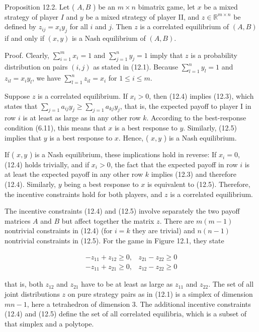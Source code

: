 \documentclass[12pt]{article}
\begin{document}
Proposition 12.2. Let ( $A, B$ ) be an $m \times n$ bimatrix game, let $x$ be a mixed strategy of player $I$ and $y$ be a mixed strategy of player II, and $z \in \mathbb{R}^{m \times n}$ be defined by $z_{i j}=x_{i} y_{j}$ for all $i$ and $j$. Then $z$ is a correlated equilibrium of $(A, B)$ if and only if $(x, y)$ is a Nash equilibrium of $(A, B)$.

Proof. Clearly, $\sum_{i=1}^{m} x_{i}=1$ and $\sum_{j=1}^{n} y_{j}=1$ imply that $z$ is a probability distribution on pairs $(i, j)$ as stated in (12.1). Because $\sum_{l=1}^{n} y_{l}=1$ and $z_{i l}=x_{i} y_{l}$, we have $\sum_{l=1}^{n} z_{i l}=x_{i}$ for $1 \leq i \leq m$.

Suppose $z$ is a correlated equilibrium. If $x_{i}>0$, then (12.4) implies (12.3), which states that $\sum_{j=1} a_{i j} y_{j} \geq \sum_{j=1} a_{k j} y_{j}$, that is, the expected payoff to player I in row $i$ is at least as large as in any other row $k$. According to the best-response condition (6.11), this means that $x$ is a best response to $y$. Similarly, (12.5) implies that $y$ is a best response to $x$. Hence, ( $x, y$ ) is a Nash equilibrium.

If ( $x, y$ ) is a Nash equilibrium, these implications hold in reverse: If $x_{i}=0$, (12.4) holds trivially, and if $x_{i}>0$, the fact that the expected payoff in row $i$ is at least the expected payoff in any other row $k$ implies (12.3) and therefore (12.4). Similarly, $y$ being a best response to $x$ is equivalent to (12.5). Therefore, the incentive constraints hold for both players, and $z$ is a correlated equilibrium.

The incentive constraints (12.4) and (12.5) involve separately the two payoff matrices $A$ and $B$ but affect together the matrix $z$. There are $m(m-1)$ nontrivial constraints in (12.4) (for $i=k$ they are trivial) and $n(n-1)$ nontrivial constraints in (12.5). For the game in Figure 12.1, they state

\[
\begin{array}{ll}
-z_{11}+z_{12} \geq 0, & z_{21}-z_{22} \geq 0  \tag{12.6}\\
-z_{11}+z_{21} \geq 0, & z_{12}-z_{22} \geq 0
\end{array}
\]

that is, both $z_{12}$ and $z_{21}$ have to be at least as large as $z_{11}$ and $z_{22}$. The set of all joint distributions $z$ on pure strategy pairs as in (12.1) is a simplex of dimension $m n-1$, here a tetrahedron of dimension 3. The additional incentive constraints (12.4) and (12.5) define the set of all correlated equilibria, which is a subset of that simplex and a polytope.
\end{document}
